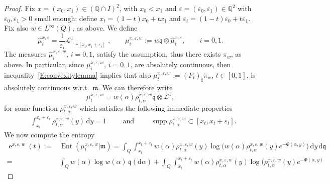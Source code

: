 \documentclass[10pt,a4paper]{amsart}
\DeclareMathOperator{\Ent}{Ent}
\DeclareMathOperator{\ee}{e}
\DeclareMathOperator{\supp}{supp}
\let\epsilon\varepsilon
\let\varepsilon\temp
\newcommand{\Leb}{\mathcal{L}}
\newcommand{\Q}{\mathbb{Q}}
\newcommand{\de}{{\mathrm{d}}}
\newcommand{\mm}{\mathfrak m}
\newcommand{\q}{\mathfrak{q}}
\renewcommand{\L}{\mathcal{L}}
\begin{document}
\begin{proof}
  Fix $x=(x_0,x_1)\in(\Q\cap I)^2$, with $x_0<x_1$ and
  $\epsilon=(\epsilon_0,\epsilon_1)\in \Q^2$ with
  $\epsilon_0,\epsilon_1>0$ small enough; define  $x_t=(1-t)x_0+t x_1$ and
  $\epsilon_t=(1-t)\epsilon_0+t\epsilon_1$.
  Fix also $w\in L^\infty(Q)$, as above.
  We define
  \begin{equation*}
    \hat\mu_i^{x,\epsilon}
    =
    \frac{1}{\epsilon_i}
    \L^1\llcorner_{[x_i,x_i+\epsilon_i]},
    \qquad
    \mu_i^{x,\epsilon,w}
    :=
    w\q\otimes
    \hat\mu_i^{x,\epsilon}
    ,
    \qquad
    i=0,1
    .
  \end{equation*}
  The measures $\hat\mu_i^{x,\epsilon,w}$, $i=0,1$, satisfy the
  assumption, thus there exists $\pi_w$, as above.
  In particular, since $\mu_i^{x,\epsilon,w}$, $i=0,1$, are absolutely
  continuous, then inequality~\eqref{E:convexitylemma} implies that
  also $\mu_t^{x,\epsilon,w}:=(F_t)_{\sharp}\pi_w$,
  $t\in[0,1]$, is absolutely continuous w.r.t.\ $\mm$.
  We can therefore write
  \begin{equation}
    \mu_t^{x,\epsilon,w}
    =
    w(\alpha)
    \rho^{x,\epsilon,w}_{t,\alpha}
    \q
    \otimes \Leb^1
    ,
  \end{equation}
  for some function $ \rho^{x,\epsilon,w}_{t,\alpha}$ which satisfies
  the following immediate properties
  \begin{align}
    &
      \int_{x_t}^{x_t+\epsilon_t}
          \rho^{x,\epsilon,w}_{t,\alpha}(y)
      \,
      \de y
      =1
      \qquad
      \text{ and }
      \qquad
      \supp     \rho^{x,\epsilon,w}_{t,\alpha}
      \subset
      [x_t,x_t+\epsilon_t]
      .
  \end{align}
  We now compute the entropy
  \begin{align*}
    \ee^{x,\epsilon,w}(t)
    :=&
        \Ent(\mu_t^{x,\epsilon,w}|\mm)
        =
        \int_Q
        \int_{x_t}^{x_t+\epsilon_t}
         w(\alpha)
         \rho^{x,\epsilon,w}_{t,\alpha}(y)
    \log
    \big(
        w(\alpha)
        \rho^{x,\epsilon,w}_{t,\alpha}(y)
        e^{-\Phi(\alpha,y)}
        \big)
        \,
        \de y
        \,
        \de\q
    \\
    =
      &
      \int_Q
      w(\alpha)
      \log
      w(\alpha)
      \,
      \q(\de\alpha)
      +
        \int_Q
        \int_{x_t}^{x_t+\epsilon_t}
         w(\alpha)
         \rho^{x,\epsilon,w}_{t,\alpha}(y)
    \log
    \big(
        \rho^{x,\epsilon,w}_{t,\alpha}(y)
        e^{-\Phi(\alpha,y)}

\end{align*}
\end{proof}
\end{document}
